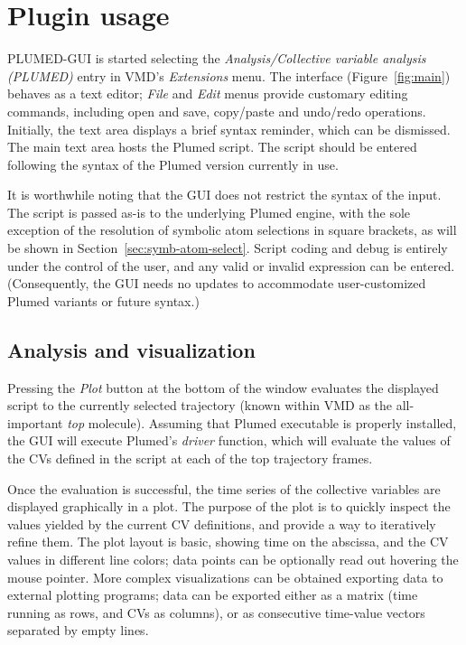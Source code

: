 \documentclass[preprint,12pt]{elsarticle}
\begin{document}
\section{Plugin usage}

 PLUMED-GUI  is started selecting the
\emph{Analysis/Collective variable analysis (PLUMED)} entry in VMD's
\emph{Extensions} menu.  The interface (Figure~\ref{fig:main}) behaves
as a text editor; \emph{File} and \emph{Edit} menus provide customary
editing commands, including open and save, copy/paste and undo/redo
operations. Initially, the text area displays a brief syntax
reminder, which can be dismissed.  The main text area hosts
the Plumed script.  The script should be entered following
the syntax of the Plumed version
currently in use.



It is worthwhile noting that the GUI does not restrict the syntax of
the input. The script is passed as-is to the underlying Plumed engine,
with the sole exception of the resolution of symbolic atom selections
in square brackets, as will be shown in
Section~\ref{sec:symb-atom-select}.  Script coding and debug is
entirely under the control of the user, and any valid or invalid
expression can be entered.  (Consequently, the GUI needs no updates to
accommodate user-customized Plumed variants or future syntax.)




\subsection{Analysis and visualization}

Pressing the \emph{Plot} button at the bottom of the window evaluates
the displayed script to the currently selected trajectory (known
within VMD as the all-important \emph{top} molecule). Assuming that
Plumed executable is properly installed, the GUI will execute Plumed's
\emph{driver} function, which will evaluate the values of the CVs
defined in the script at each of the top trajectory frames.

Once the evaluation is successful, the time series of the collective
variables are displayed graphically in a plot.  The purpose of the
plot is to quickly inspect the values yielded by the current CV
definitions, and provide a way to iteratively refine them. The plot
layout is basic, showing time on the abscissa, and the CV values in
different line colors; data points can be optionally read out hovering the
mouse pointer.  More complex visualizations can be obtained exporting
data to external plotting programs; data can be exported 
either as a matrix (time running as rows, and CVs as
columns), or as consecutive time-value vectors separated by empty
lines.
\end{document}
